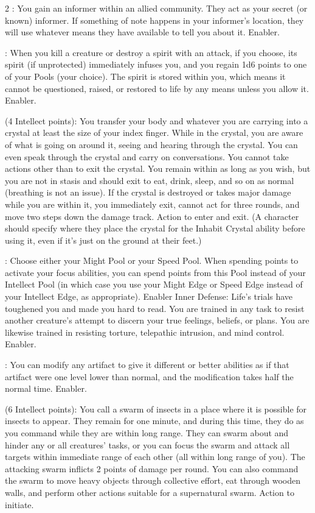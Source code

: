 \begin{multicols}{2}
: You gain an informer within an allied community. They act as your secret (or known) informer. If something of note happens in your informer’s location, they will use whatever means they have available to tell you about it. Enabler. 
 
: When you kill a creature or destroy a spirit with an attack, if you choose, its spirit (if unprotected) immediately infuses you, and you regain 1d6 points to one of your Pools (your choice). The spirit is stored within you, which means it cannot be questioned, raised, or restored to life by any means unless you allow it. Enabler. 
 
 (4 Intellect points): You transfer your body and whatever you are carrying into a crystal at least the size of your index finger. While in the crystal, you are aware of what is going on around it, seeing and hearing through the crystal. You can even speak through the crystal and carry on conversations. You cannot take actions other than to exit the crystal. You remain within as long as you wish, but you are not in stasis and should exit to eat, drink, sleep, and so on as normal (breathing is not an issue). If the crystal is destroyed or takes major damage while you are within it, you immediately exit, cannot act for three rounds, and move two steps down the damage track. Action to enter and exit. (A character should specify where they place the crystal for the Inhabit Crystal ability before using it, even if it’s just on the ground at their feet.)
 
: Choose either your Might Pool or your Speed Pool. When spending points to activate your focus abilities, you can spend points from this Pool instead of your Intellect Pool (in which case you use your Might Edge or Speed Edge instead of your Intellect Edge, as appropriate). Enabler
Inner Defense: Life’s trials have toughened you and made you hard to read. You are trained in any task to resist another creature’s attempt to discern your true feelings, beliefs, or plans. You are likewise trained in resisting torture, telepathic intrusion, and mind control. Enabler.
 
: You can modify any artifact to give it different or better abilities as if that artifact were one level lower than normal, and the modification takes half the normal time. Enabler.
 
 (6 Intellect points): You call a swarm of insects in a place where it is possible for insects to appear. They remain for one minute, and during this time, they do as you command while they are within long range. They can swarm about and hinder any or all creatures’ tasks, or you can focus the swarm and attack all targets within immediate range of each other (all within long range of you). The attacking swarm inflicts 2 points of damage per round. You can also command the swarm to move heavy objects through collective effort, eat through wooden walls, and perform other actions suitable for a supernatural swarm. Action to initiate. 
 

\end{multicols}
